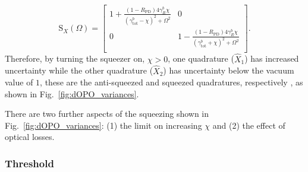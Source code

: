 \begin{equation} \label{eq:dOPO_fixed_phase}
\text{S}_X(\Omega)=\left[
\begin{array}{cc}
 1+\frac{(1-R_\text{PD})4 \gamma^b_R \chi}{\left({\gamma^b_\text{tot}}-\chi\right)^2+\Omega ^2}
 & 0 \\
 0
 & 1-\frac{(1-R_\text{PD})4 \gamma^b_R \chi}{\left({\gamma^b_\text{tot}}+\chi\right)^2+\Omega ^2} \\
\end{array}
\right].
\end{equation}
Therefore, by turning the squeezer on, $\chi>0$, one quadrature ($\hat X_1$) has increased uncertainty while the other quadrature ($\hat X_2$) has uncertainty below the vacuum value of $1$, these are the anti-squeezed and squeezed quadratures, respectively , as shown in Fig.~\ref{fig:dOPO_variances}. %


There are two further aspects of the squeezing shown in Fig.~\ref{fig:dOPO_variances}: (1) the limit on increasing $\chi$ and (2) the effect of optical losses.

\subsubsection{Threshold}
\label{sec:dOPO_threshold}


